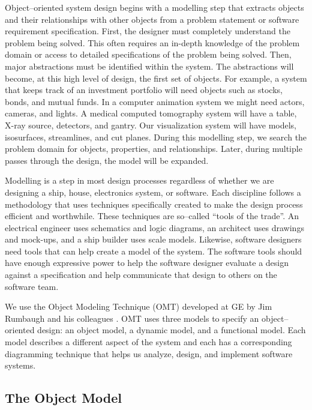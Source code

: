Object--oriented system design begins with a modelling step that extracts objects and their relationships with other objects from a problem statement or software requirement specification. First, the designer must completely understand the problem being solved. This often requires an in-depth knowledge of the problem domain or access to detailed specifications of the problem being solved. Then, major abstractions must be identified within the system. The abstractions will become, at this high level of design, the first set of objects. For example, a system that keeps track of an investment portfolio will need objects such as stocks, bonds, and mutual funds. In a computer animation system we might need actors, cameras, and lights. A medical computed tomography system will have a table, X-ray source, detectors, and gantry. Our visualization system will have models, isosurfaces, streamlines, and cut planes. During this modelling step, we search the problem domain for objects, properties, and relationships. Later, during multiple passes through the design, the model will be expanded.

Modelling is a step in most design processes regardless of whether we are designing a ship, house, electronics system, or software. Each discipline follows a methodology that uses techniques specifically created to make the design process efficient and worthwhile. These techniques are so--called ``tools of the trade''. An electrical engineer uses schematics and logic diagrams, an architect uses drawings and mock-ups, and a ship builder uses scale models. Likewise, software designers need tools that can help create a model of the system. The software tools should have enough expressive power to help the software designer evaluate a design against a specification and help communicate that design to others on the software team.

We use the Object Modeling Technique (OMT) developed at GE by Jim Rumbaugh and his colleagues \cite{Rumbaugh91}. OMT uses three models to specify an object--oriented design: an object model, a dynamic model, and a functional model. Each model describes a different aspect of the system and each has a corresponding diagramming technique that helps us analyze, design, and implement software systems.

\subsection{The Object Model}

